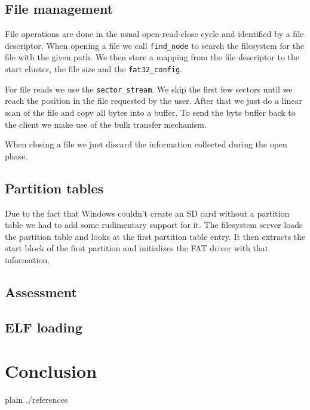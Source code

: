 \documentclass[a4paper,10pt]{article}
\begin{document}
\subsection{File management}

File operations are done in the usual open-read-close cycle and identified by a file descriptor.
When opening a file we call \lstinline!find_node! to search the filesystem for the file with the given path.
We then store a mapping from the file descriptor to the start cluster, the file size and the \lstinline!fat32_config!.

For file reads we use the \lstinline!sector_stream!.
We skip the first few sectors until we reach the position in the file requested by the user.
After that we just do a linear scan of the file and copy all bytes into a buffer.
To send the byte buffer back to the client we make use of the bulk transfer mechanism.

When closing a file we just discard the information collected during the open phase.

\subsection{Partition tables}

Due to the fact that Windows couldn't create an SD card without a partition table we had to add some rudimentary support for it.
The filesystem server loads the partition table and looks at the first partition table entry.
It then extracts the start block of the first partition and initializes the FAT driver with that information.

\subsection{Assessment}


\subsection{ ELF loading}


\section{Conclusion}

\begin{flushleft}
{{{
 {plain}
 {./references}
}}}
\end{flushleft}


\todos
\end{document}
